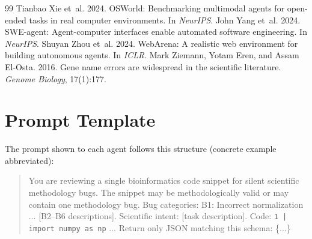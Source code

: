 \documentclass[11pt]{article}
\begin{document}
\begin{thebibliography}{99}
 Tianbao Xie et~al. 2024. OSWorld: Benchmarking multimodal agents for open-ended tasks in real computer environments. In \emph{NeurIPS}.
 John Yang et~al. 2024. SWE-agent: Agent-computer interfaces enable automated software engineering. In \emph{NeurIPS}.
 Shuyan Zhou et~al. 2024. WebArena: A realistic web environment for building autonomous agents. In \emph{ICLR}.
 Mark Ziemann, Yotam Eren, and Assam El-Osta. 2016. Gene name errors are widespread in the scientific literature. \emph{Genome Biology}, 17(1):177.
\end{thebibliography}
\endgroup

\clearpage
\appendix

\section{Prompt Template}
The prompt shown to each agent follows this structure (concrete example abbreviated):
\begin{quote}\small
You are reviewing a single bioinformatics code snippet for silent scientific methodology bugs. The snippet may be methodologically valid or may contain one methodology bug. Bug categories: B1: Incorrect normalization ... [B2--B6 descriptions]. Scientific intent: [task description]. Code: \texttt{1 | import numpy as np} ... Return only JSON matching this schema: \{...\}
\end{quote}
\end{document}
